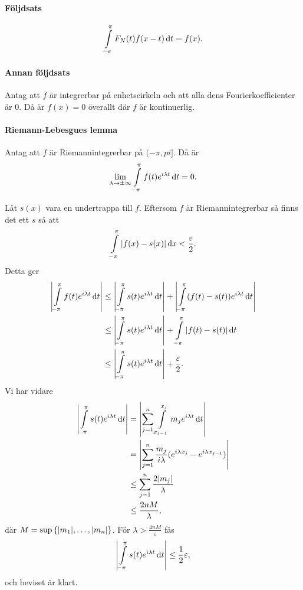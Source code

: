\paragraph{Följdsats}
\begin{align*}
	\int\limits_{-\pi}^{\pi}F_{N}(t)f(x - t)\dd{t} = f(x).
\end{align*}

\proof

\paragraph{Annan följdsats}
Antag att $f$ är integrerbar på enhetscirkeln och att alla dens Fourierkoefficienter är $0$. Då är $f(x) = 0$ överallt där $f$ är kontinuerlig.

\proof

\paragraph{Riemann-Lebesgues lemma}
Antag att $f$ är Riemannintegrerbar på $(-\pi, pi]$. Då är
\begin{align*}
	\lim\limits_{\lambda\to\pm\infty}\int\limits_{-\pi}^{\pi}f(t)e^{i\lambda t}\dd{t} = 0.
\end{align*}

\proof
Låt $s(x)$ vara en undertrappa till $f$. Eftersom $f$ är Riemannintegrerbar så finns det ett $s$ så att
\begin{align*}
	\int\limits_{-\pi}^{\pi}\abs{f(x) - s(x)}\dd{x} < \frac{\varepsilon}{2}.
\end{align*}
Detta ger
\begin{align*}
	\abs{\int\limits_{-\pi}^{\pi}f(t)e^{i\lambda t}\dd{t}} &\leq \abs{\int\limits_{-\pi}^{\pi}s(t)e^{i\lambda t}\dd{t}} + \abs{\int\limits_{-\pi}^{\pi}(f(t) - s(t))e^{i\lambda t}\dd{t}} \\
	                                                 &\leq \abs{\int\limits_{-\pi}^{\pi}s(t)e^{i\lambda t}\dd{t}} + \int\limits_{-\pi}^{\pi}\abs{f(t) - s(t)}\dd{t} \\
	                                                 &\leq \abs{\int\limits_{-\pi}^{\pi}s(t)e^{i\lambda t}\dd{t}} + \frac{\varepsilon}{2}.
\end{align*}
Vi har vidare
\begin{align*}
	\abs{\int\limits_{-\pi}^{\pi}s(t)e^{i\lambda t}\dd{t}} &= \abs{\sum\limits_{j = 1}^{n}\int\limits_{x_{j - 1}}^{x_{j}}m_{j}e^{i\lambda t}\dd{t}} \\
	                                                 &= \abs{\sum\limits_{j = 1}^{n}\frac{m_{j}}{i\lambda}(e^{i\lambda x_{j}} - e^{i\lambda x_{j - 1}})} \\
	                                                 &\leq \sum\limits_{j = 1}^{n}\frac{2\abs{m_{j}}}{\lambda} \\
	                                                 &\leq \frac{2nM}{\lambda},
\end{align*}
där $M = \sup{\{\abs{m_{1}}, \dots, \abs{m_{n}}\}}$. För $\lambda > \frac{4nM}{\varepsilon}$ fås
\begin{align*}
	\abs{\int\limits_{-\pi}^{\pi}s(t)e^{i\lambda t}\dd{t}} \leq \frac{1}{2}\varepsilon,
\end{align*}
och beviset är klart.

